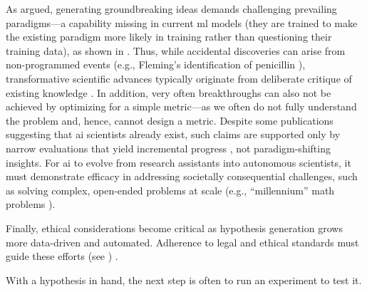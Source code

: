 As \textcite{Kuhn1962Structure} argued, generating groundbreaking ideas demands challenging prevailing paradigms---a capability missing in current \gls{ml} models (they are trained to make the existing paradigm more likely in training rather than questioning their training data), as shown in . 
Thus, while accidental discoveries can arise from non-programmed events (e.g., Fleming’s identification of penicillin \autocite{Fleming1929antibacterial, Fleming1945penicillin}), transformative scientific advances typically originate from deliberate critique of existing knowledge \autocite{popper1959logic, Lakatos1970falsification}. In addition, very often breakthroughs can also not be achieved by optimizing for a simple metric---as we often do not fully understand the problem and, hence, cannot design a metric.\autocite{stanley2015greatness}
Despite some publications suggesting that \gls{ai} scientists already exist, such claims are supported only by narrow evaluations that yield incremental progress \autocite{novikov2025alphaevolve}, not paradigm-shifting insights. For \gls{ai} to evolve from research assistants into autonomous scientists, it must demonstrate efficacy in addressing societally consequential challenges, such as solving complex, open-ended problems at scale (e.g., \enquote{millennium} math problems
\autocite{Carlson2006millennium}).

Finally, ethical considerations become critical as hypothesis generation grows more data-driven and automated. Adherence to legal and ethical standards must guide these efforts (see ) \autocite{danish_gov2024hypothesis}.

With a hypothesis in hand, the next step is often to run an experiment to test it. 